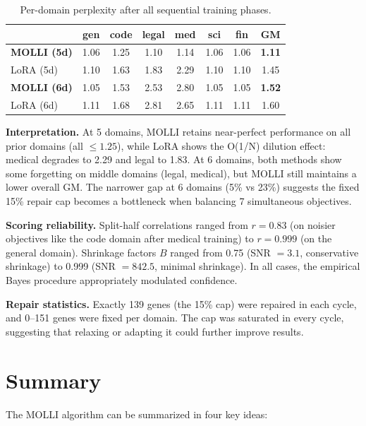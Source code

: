 \documentclass[11pt,letterpaper]{article}
\theoremstyle{definition}
\begin{document}
\begin{table}[H]
\centering
\caption{Per-domain perplexity after all sequential training phases.}
\label{tab:perdomain}
\small
\begin{tabular}{@{}lccccccc@{}}
\toprule
& gen & code & legal & med & sci & fin & \textbf{GM} \\
\midrule
\rowcolor{wingreen}
\textbf{MOLLI (5d)} & 1.06 & 1.25 & 1.10 & 1.14 & 1.06 & 1.06 & \textbf{1.11} \\
LoRA (5d) & 1.10 & 1.63 & 1.83 & 2.29 & 1.10 & 1.10 & 1.45 \\
\midrule
\textbf{MOLLI (6d)} & 1.05 & 1.53 & 2.53 & 2.80 & 1.05 & 1.05 & \textbf{1.52} \\
LoRA (6d) & 1.11 & 1.68 & 2.81 & 2.65 & 1.11 & 1.11 & 1.60 \\
\bottomrule
\end{tabular}
\end{table}

\textbf{Interpretation.} At 5 domains, MOLLI retains near-perfect performance on all prior domains (all $\leq 1.25$), while LoRA shows the O(1/N) dilution effect: medical degrades to 2.29 and legal to 1.83. At 6 domains, both methods show some forgetting on middle domains (legal, medical), but MOLLI still maintains a lower overall GM. The narrower gap at 6 domains (5\% vs 23\%) suggests the fixed 15\% repair cap becomes a bottleneck when balancing 7 simultaneous objectives.

\textbf{Scoring reliability.} Split-half correlations ranged from $r = 0.83$ (on noisier objectives like the code domain after medical training) to $r = 0.999$ (on the general domain). Shrinkage factors $B$ ranged from 0.75 (SNR $= 3.1$, conservative shrinkage) to 0.999 (SNR $= 842.5$, minimal shrinkage). In all cases, the empirical Bayes procedure appropriately modulated confidence.

\textbf{Repair statistics.} Exactly 139 genes (the 15\% cap) were repaired in each cycle, and 0--151 genes were fixed per domain. The cap was saturated in every cycle, suggesting that relaxing or adapting it could further improve results.


\section{Summary}

The MOLLI algorithm can be summarized in four key ideas:
\end{document}

